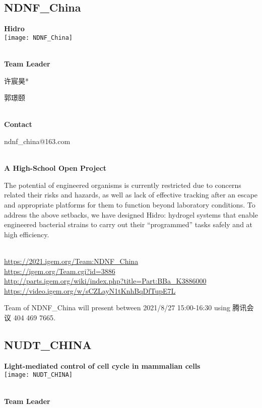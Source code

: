 \subsection{\textcolor{Blu}{ NDNF\_China } }
\vspace{5mm}
\begin{center}
\large{
  \textbf{ Hidro }\\

  \texttt{[image: NDNF\_China]}
}
\end{center}
\textbf{\\Team Leader}

  许宸昊*

  郭璟颐


\textbf{\\Contact}

  ndnf\_china@163.com


\textbf{\\A High-School Open Project\\}\begin{spacing}{1.5}

The potential of engineered organisms is currently restricted due to concerns related their risks and hazards, as well as lack of effective tracking after an escape and appropriate platforms for them to function beyond laboratory conditions. To address the above setbacks, we have designed Hidro: hydrogel systems that enable engineered bacterial strains to carry out their “programmed” tasks safely and at high efficiency.\end{spacing}
\\

\url{https://2021.igem.org/Team:NDNF\_China }\\
\url{https://igem.org/Team.cgi?id=3886 }\\
\url{http://parts.igem.org/wiki/index.php?title=Part:BBa_K3886000 }\\
\url{https://video.igem.org/w/sCZLayN1tKnhBqDfTupE7L }\\

\vfill{}









Team of NDNF\_China will present between  2021/8/27 15:00-16:30       using 腾讯会议 404 469 7665.
\newpage


\subsection{\textcolor{Blu}{ NUDT\_CHINA } }
\vspace{5mm}
\begin{center}
\large{
  \textbf{ Light-mediated control of cell cycle in mammalian cells }\\

  \texttt{[image: NUDT\_CHINA]}
}
\end{center}
\textbf{\\Team Leader}

